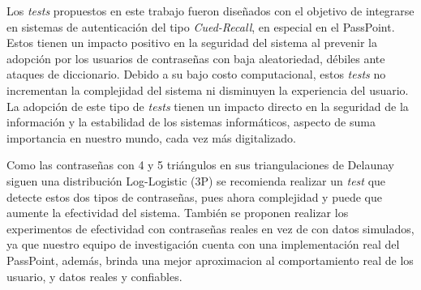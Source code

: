 \documentclass[12pt]{report}
\begin{document}
Los \textit{tests} propuestos en este trabajo fueron diseñados con el objetivo de integrarse en sistemas de autenticación del tipo \textit{Cued-Recall}, en especial en el PassPoint. Estos tienen un impacto positivo en la seguridad del sistema al prevenir la adopción por los usuarios de contraseñas con baja aleatoriedad, débiles ante ataques de diccionario. Debido a su bajo costo computacional, estos \textit{tests} no incrementan la complejidad del sistema ni disminuyen la experiencia del usuario. La adopción de este tipo de \textit{tests} tienen un impacto directo en la seguridad de la información y la estabilidad de los sistemas informáticos, aspecto de suma importancia en nuestro mundo, cada vez más digitalizado.


Como las contraseñas con 4 y 5 triángulos en sus triangulaciones de Delaunay siguen una distribución Log-Logistic (3P) se recomienda realizar  un \textit{test} que detecte estos dos tipos de contraseñas, pues ahora complejidad y puede que aumente la efectividad del sistema. También se proponen realizar los experimentos de efectividad con contraseñas reales en vez de con datos simulados, ya que nuestro equipo de investigación cuenta con una implementación real del PassPoint, además, brinda una mejor aproximacion al comportamiento real de los usuario, y datos reales y confiables.
\end{document}
